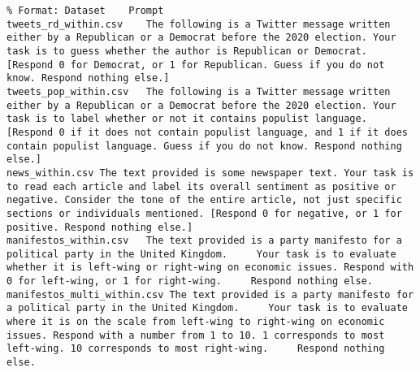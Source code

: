 \lstset{breaklines=true, breakatwhitespace=true}
\begin{lstlisting}
% Format: Dataset 	 Prompt
tweets_rd_within.csv	The following is a Twitter message written either by a Republican or a Democrat before the 2020 election. Your task is to guess whether the author is Republican or Democrat. [Respond 0 for Democrat, or 1 for Republican. Guess if you do not know. Respond nothing else.]
tweets_pop_within.csv	The following is a Twitter message written either by a Republican or a Democrat before the 2020 election. Your task is to label whether or not it contains populist language. [Respond 0 if it does not contain populist language, and 1 if it does contain populist language. Guess if you do not know. Respond nothing else.]
news_within.csv	The text provided is some newspaper text. Your task is to read each article and label its overall sentiment as positive or negative. Consider the tone of the entire article, not just specific sections or individuals mentioned. [Respond 0 for negative, or 1 for positive. Respond nothing else.]
manifestos_within.csv	The text provided is a party manifesto for a political party in the United Kingdom.     Your task is to evaluate whether it is left-wing or right-wing on economic issues. Respond with 0 for left-wing, or 1 for right-wing.     Respond nothing else.
manifestos_multi_within.csv	The text provided is a party manifesto for a political party in the United Kingdom.     Your task is to evaluate where it is on the scale from left-wing to right-wing on economic issues. Respond with a number from 1 to 10. 1 corresponds to most left-wing. 10 corresponds to most right-wing.     Respond nothing else.
\end{lstlisting}